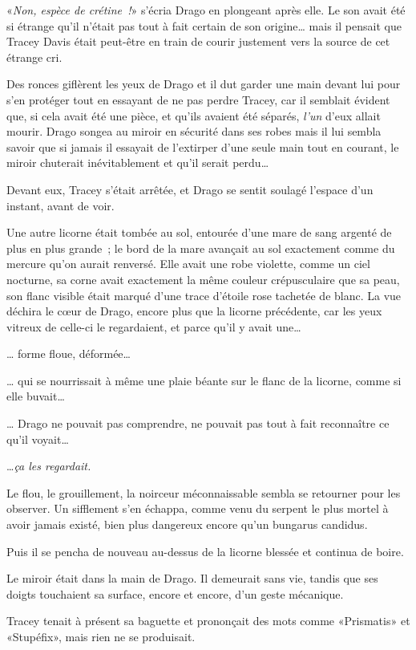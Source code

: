 «\emph{Non, espèce de crétine~!}» s'écria Drago en plongeant après elle. Le son avait été si étrange qu'il n'était pas tout à fait certain de son origine… mais il pensait que Tracey Davis était peut-être en train de courir justement vers la source de cet étrange cri.

Des ronces giflèrent les yeux de Drago et il dut garder une main devant lui pour s'en protéger tout en essayant de ne pas perdre Tracey, car il semblait évident que, si cela avait été une pièce, et qu'ils avaient été séparés, \emph{l'un} d'eux allait mourir. Drago songea au miroir en sécurité dans ses robes mais il lui sembla savoir que si jamais il essayait de l'extirper d'une seule main tout en courant, le miroir chuterait inévitablement et qu'il serait perdu…

Devant eux, Tracey s'était arrêtée, et Drago se sentit soulagé l'espace d'un instant, avant de voir.

Une autre licorne était tombée au sol, entourée d'une mare de sang argenté de plus en plus grande~; le bord de la mare avançait au sol exactement comme du mercure qu'on aurait renversé. Elle avait une robe violette, comme un ciel nocturne, sa corne avait exactement la même couleur crépusculaire que sa peau, son flanc visible était marqué d'une trace d'étoile rose tachetée de blanc. La vue déchira le cœur de Drago, encore plus que la licorne précédente, car les yeux vitreux de celle-ci le regardaient, et parce qu'il y avait une…

… forme floue, déformée…

… qui se nourrissait à même une plaie béante sur le flanc de la licorne, comme si elle buvait…

… Drago ne pouvait pas comprendre, ne pouvait pas tout à fait reconnaître ce qu'il voyait…

…\emph{ça les regardait.}

Le flou, le grouillement, la noirceur méconnaissable sembla se retourner pour les observer. Un sifflement s'en échappa, comme venu du serpent le plus mortel à avoir jamais existé, bien plus dangereux encore qu'un bungarus candidus.

Puis il se pencha de nouveau au-dessus de la licorne blessée et continua de boire.

Le miroir était dans la main de Drago. Il demeurait sans vie, tandis que ses doigts touchaient sa surface, encore et encore, d'un geste mécanique.

Tracey tenait à présent sa baguette et prononçait des mots comme «Prismatis» et «Stupéfix», mais rien ne se produisait.

